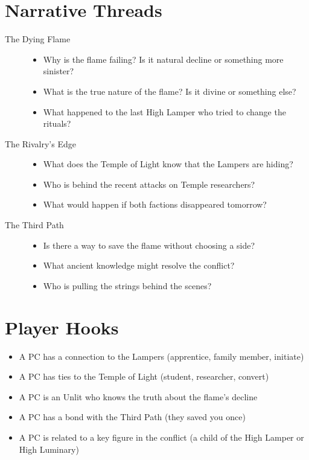 \documentclass[12pt]{article}
\begin{document}
\section{Narrative Threads}

\begin{description}
    \item[The Dying Flame]
    \begin{itemize}
        \item Why is the flame failing? Is it natural decline or something more sinister?
        \item What is the true nature of the flame? Is it divine or something else?
        \item What happened to the last High Lamper who tried to change the rituals?
    \end{itemize}
    
    \item[The Rivalry's Edge]
    \begin{itemize}
        \item What does the Temple of Light know that the Lampers are hiding?
        \item Who is behind the recent attacks on Temple researchers?
        \item What would happen if both factions disappeared tomorrow?
    \end{itemize}
    
    \item[The Third Path]
    \begin{itemize}
        \item Is there a way to save the flame without choosing a side?
        \item What ancient knowledge might resolve the conflict?
        \item Who is pulling the strings behind the scenes?
    \end{itemize}
\end{description}

\section{Player Hooks}

\begin{itemize}
    \item A PC has a connection to the Lampers (apprentice, family member, initiate)
    \item A PC has ties to the Temple of Light (student, researcher, convert)
    \item A PC is an Unlit who knows the truth about the flame's decline
    \item A PC has a bond with the Third Path (they saved you once)
    \item A PC is related to a key figure in the conflict (a child of the High Lamper or High Luminary)
\end{itemize}
\end{document}
